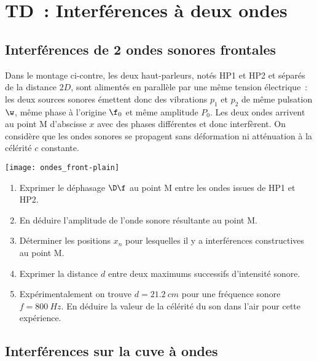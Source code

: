 \documentclass[a4paper, 12pt, final, garamond]{book}
\begin{document}
\setcounter{chapter}{1}

\chapter{TD~: Interf\'erences \`a deux ondes}
\section{Interférences de 2 ondes sonores frontales}

\begin{minipage}{0.65\linewidth}
    Dans le montage ci-contre, les deux haut-parleurs, notés HP1 et HP2 et
    séparés de la distance $2D$, sont alimentés en parallèle par une même
    tension électrique~: les deux sources sonores émettent donc des vibrations
    $p_1$ et $p_2$ de même pulsation $\w$, même phase à l'origine $\f_0$ et même
    amplitude $P_0$. Les deux ondes arrivent au point M d'abscisse $x$ avec des
    phases différentes et donc interfèrent. On considère que les ondes sonores
    se propagent sans déformation ni atténuation à la célérité $c$ constante.
\end{minipage}
\hfill
\begin{minipage}{0.35\linewidth}
    \begin{center}
        \texttt{[image: ondes\_front-plain]}
    \end{center}
\end{minipage}

\begin{enumerate}
    \item Exprimer le déphasage $\D\f$ au point M entre les ondes issues de HP1
        et HP2.
    \item En déduire l'amplitude de l'onde sonore résultante au point M.
    \item Déterminer les positions $x_n$ pour lesquelles il y a interférences
        constructives au point M.
    \item Exprimer la distance $d$ entre deux maximums successifs d'intensité
        sonore.
    \item Expérimentalement on trouve $d = \SI{21.2}{cm}$ pour une fréquence
        sonore $f = \SI{800}{Hz}$. En déduire la valeur de la célérité du son
        dans l'air pour cette expérience.
\end{enumerate}

\section{Interférences sur la cuve à ondes}
\end{document}
